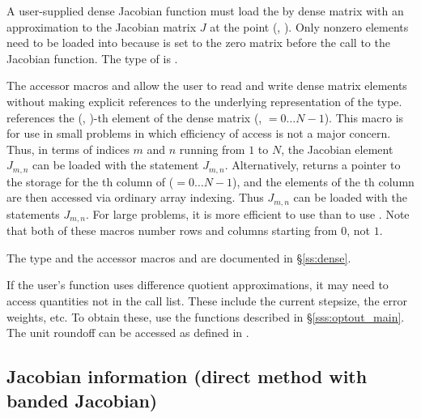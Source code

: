 {
  A user-supplied dense Jacobian function must load the  by 
  dense matrix  with an approximation to the Jacobian matrix $J$
  at the point (, ).  Only nonzero elements need to be loaded
  into  because  is set to the zero matrix before the call
  to the Jacobian function. The type of  is . 
  
  The accessor macros  and  allow the user to
  read and write dense matrix elements without making explicit
  references to the underlying representation of the 
  type.  references the (, )-th
  element of the dense matrix  (, $= 0\ldots N-1$). This macro
  is for use in small problems in which efficiency of access is not a major
  concern.  Thus, in terms of indices $m$ and $n$ running from $1$ to
  $N$, the Jacobian element $J_{m,n}$ can be loaded with the statement
   $J_{m,n}$.  Alternatively,
   returns a pointer to the storage for
  the th column of  ($= 0\ldots N-1$), and the 
  elements of the th column
  are then accessed via ordinary array indexing.  Thus $J_{m,n}$ can be 
  loaded with the statements 
   $J_{m,n}$.  For large problems, it is more 
  efficient to use  than to use . 
  Note that both of these macros number rows and columns
  starting from $0$, not $1$.  

  The  type and the accessor macros  and 
   are documented in \S\ref{ss:dense}.

  If the user's  function uses difference quotient
  approximations, it may need to access quantities not in the call
  list. These include the current stepsize, the error weights, etc.
  To obtain these, use the  functions described in
  \S\ref{sss:optout_main}. The unit roundoff can be accessed
  as  defined in .
}

\subsection{Jacobian information (direct method with banded Jacobian)}
\label{ss:bjacFn}

